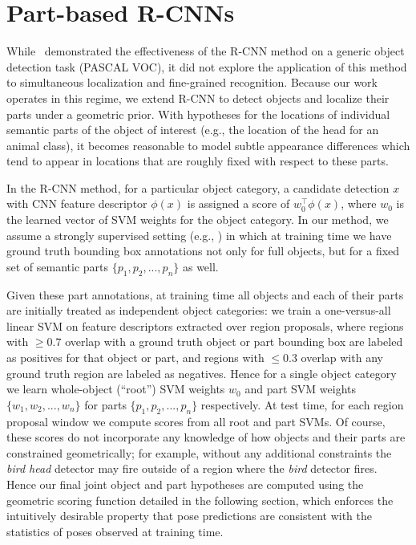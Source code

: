 \section{Part-based R-CNNs}
\label{sec:recursive-part-dets}

While~\cite{rcnn} demonstrated the effectiveness of the R-CNN method on a generic object detection task (PASCAL VOC), it did not explore the application of this method to simultaneous localization and fine-grained recognition.
Because our work operates in this regime, we extend R-CNN to detect objects and localize their parts under a geometric prior.
With hypotheses for the locations of individual semantic parts of the object of interest (e.g., the location of the head for an animal class), it becomes reasonable to model subtle appearance differences which tend to appear in locations that are roughly fixed with respect to these parts.

In the R-CNN method, for a particular object category, a candidate detection $x$ with CNN feature descriptor $\phi(x)$ is assigned a score of $w_0^{\intercal} \phi(x)$, where $w_0$ is the learned vector of SVM weights for the object category.
In our method, we assume a strongly supervised setting (e.g., \cite{Hossein_ECCV12}) in which at training time we have ground truth bounding box annotations not only for full objects, but for a fixed set of semantic parts $\{p_1, p_2, ..., p_n\}$ as well.

Given these part annotations, at training time all objects and each of their parts are initially treated as independent object categories: we train a one-versus-all linear SVM on feature descriptors extracted over region proposals, where regions with $\ge 0.7$ overlap with a ground truth object or part bounding box are labeled as positives for that object or part, and regions with $\le 0.3$ overlap with any ground truth region are labeled as negatives.
Hence for a single object category we learn whole-object (``root'') SVM weights $w_0$ and part SVM weights $\{w_1, w_2, ..., w_n\}$ for parts $\{p_1, p_2, ..., p_n\}$ respectively.
At test time, for each region proposal window we compute scores from all root and part SVMs.
Of course, these scores do not incorporate any knowledge of how objects and their parts are constrained geometrically; for example, without any additional constraints the \textit{bird head} detector may fire outside of a region where the \textit{bird} detector fires.
Hence our final joint object and part hypotheses are computed using the geometric scoring function detailed in the following section, which enforces the intuitively desirable property that pose predictions are consistent with the statistics of poses observed at training time.

